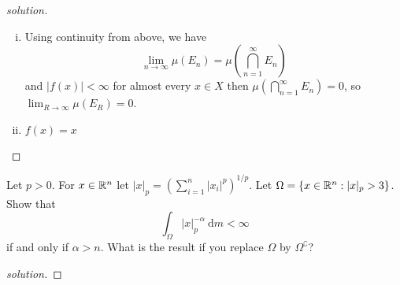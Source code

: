 \begin{proof}[solution]
  \begin{enumerate}[(i)]
    \item Using continuity from above, we have
    \[\lim_{n\to\infty} \mu(E_n) = \mu\left(\bigcap_{n=1}^\infty E_n\right)\]
    and $|f(x)| < \infty$ for almost every $x \in X$ then $\mu\left(\bigcap_{n=1}^\infty E_n\right) = 0$, so $\lim_{R\to\infty} \mu(E_R) = 0$.
    \item $f(x) = x$
  \end{enumerate}
\end{proof}

\begin{problem}
  Let $p > 0$. For $x \in \mathbb R^n$ let $|x|_p = (\sum_{i=1}^n |x_i|^p)^{1/p}$. Let $\Omega = \{x \in \mathbb R^n : |x|_p > 3\}$.
  Show that 
  \[\int_{\Omega} |x|_p^{-\alpha}\ \mathrm{d}m < \infty\]
  if and only if $\alpha > n$. What is the result if you replace $\Omega$ by $\Omega^\complement$?
\end{problem}

\begin{proof}[solution]

\end{proof}
